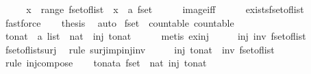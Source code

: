 \begin{isabellebody}
%
\isadelimproof
%
\endisadelimproof
%
\isatagproof
{}\isamarkupfalse%
\ {\isacharminus}\isanewline
\ \ \isamarkupfalse%
\ {\isachardoublequoteopen}x\ {\isasymin}\ range\ fset{\isacharunderscore}of{\isacharunderscore}list{\isachardoublequoteclose}\ \ x\ {\isacharcolon}{\isacharcolon}\ {\isachardoublequoteopen}{\isacharprime}a\ fset{\isachardoublequoteclose}\isanewline
\ \ \ \ \isamarkupfalse%
\ image{\isacharunderscore}iff\isanewline
\ \ \ \ \isamarkupfalse%
\ exists{\isacharunderscore}fset{\isacharunderscore}of{\isacharunderscore}list\ \isamarkupfalse%
\ fastforce\isanewline
\ \ \isamarkupfalse%
\ {\isacharquery}thesis\ \isamarkupfalse%
\ auto\isanewline
{}\isamarkupfalse%
%
\endisatagproof
{\isafoldproof}%
%
\isadelimproof
\isanewline
%
\endisadelimproof
\isanewline
{}\isamarkupfalse%
\ fset\ {\isacharcolon}{\isacharcolon}\ {\isacharparenleft}countable{\isacharparenright}\ countable\isanewline
%
\isadelimproof
%
\endisadelimproof
%
\isatagproof
{}\isamarkupfalse%
\isanewline
\ \ \isamarkupfalse%
\ to{\isacharunderscore}nat\ {\isacharcolon}{\isacharcolon}\ {\isachardoublequoteopen}{\isacharprime}a\ list\ {\isasymRightarrow}\ nat{\isachardoublequoteclose}\ \ {\isachardoublequoteopen}inj\ to{\isacharunderscore}nat{\isachardoublequoteclose}\isanewline
\ \ \ \ \isamarkupfalse%
\ {\isacharparenleft}metis\ ex{\isacharunderscore}inj{\isacharparenright}\isanewline
\ \ \isamarkupfalse%
\ \isamarkupfalse%
\ {\isachardoublequoteopen}inj\ {\isacharparenleft}inv\ fset{\isacharunderscore}of{\isacharunderscore}list{\isacharparenright}{\isachardoublequoteclose}\isanewline
\ \ \ \ \isamarkupfalse%
\ fset{\isacharunderscore}of{\isacharunderscore}list{\isacharunderscore}surj\ \isamarkupfalse%
\ {\isacharparenleft}rule\ surj{\isacharunderscore}imp{\isacharunderscore}inj{\isacharunderscore}inv{\isacharparenright}\isanewline
\ \ \isamarkupfalse%
\ \isamarkupfalse%
\ {\isachardoublequoteopen}inj\ {\isacharparenleft}to{\isacharunderscore}nat\ {\isasymcirc}\ inv\ fset{\isacharunderscore}of{\isacharunderscore}list{\isacharparenright}{\isachardoublequoteclose}\isanewline
\ \ \ \ \isamarkupfalse%
\ {\isacharparenleft}rule\ inj{\isacharunderscore}compose{\isacharparenright}\isanewline
\ \ \isamarkupfalse%
\ {\isachardoublequoteopen}{\isasymexists}to{\isacharunderscore}nat{\isacharcolon}{\isacharcolon}{\isacharprime}a\ fset\ {\isasymRightarrow}\ nat{\isachardot}\ inj\ to{\isacharunderscore}nat{\isachardoublequoteclose}\isanewline

\end{isabellebody}
